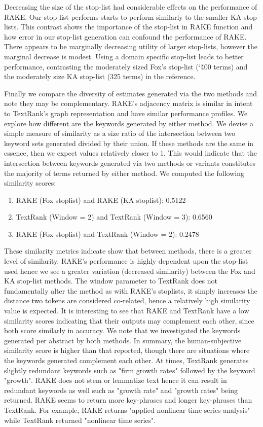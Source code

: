 \documentclass[11pt,a4paper]{article}
\begin{document}
Decreasing the size of the stop-list had considerable effects on the performance of RAKE. Our stop-list performs starts to perform similarly to the smaller KA stop-lists.  This contrast shows the importance of the stop-list in RAKE function and how error in our stop-list generation can confound the performance of RAKE. There appears to be marginally decreasing utility of larger stop-lists, however the marginal decrease is modest. Using a domain specific stop-list leads to better performance, contrasting the moderately sized Fox's stop-list (\char`\~400 terms) and the moderately size KA stop-list (325 terms) in the reference. 

Finally we compare the diversity of estimates generated via the two methods and note they may be complementary. RAKE's adjacency matrix is similar in intent to TextRank's graph representation and have similar performance profiles. We explore how different are the keywords generated by either method. We devise a simple measure of similarity as a size ratio of the intersection between two keyword sets generated divided by their union. If these methods are the same in essence, then we expect values relatively closer to 1. This would indicate that the intersection between keywords generated via two methods or variants constitutes the majority of terms returned by either method. We computed the following similarity scores:
\begin{enumerate}
	\small \itemsep0em 

	\item RAKE (Fox stoplist) and RAKE (KA stoplist): 0.5122
	\item TextRank (Window = 2) and TextRank (Window = 3):  0.6560
	\item RAKE (Fox stoplist) and TextRank (Window = 2): 0.2478
\normalsize
\end{enumerate}  

These similarity metrics indicate show that between methods, there is a greater level of similarity. RAKE's performance is highly dependent upon the stop-list used hence we see a greater variation (decreased similarity) between the Fox and KA stop-list methods. The window parameter to TextRank does not fundamentally alter the method as with RAKE's stoplists, it simply increases the distance two tokens are considered co-related, hence a relatively high similarity value is expected. It is interesting to see that  RAKE and TextRank have a low similarity scores indicating that their outputs may complement each other, since both score similarly in accuracy. We note that we investigated the keywords generated per abstract by both methods. In summary, the human-subjective similarity score is higher than that reported, though there are situations where the keywords generated complement each other. At times, TextRank generates slightly redundant keywords such as "firm growth rates" followed by the keyword "growth".  RAKE does not stem or lemmatize text hence it can result in redundant keywords as well such as "growth rate" and "growth rates" being returned. RAKE seems to return more key-phrases and longer key-phrases than TextRank. For example, RAKE returns "applied nonlinear time series analysis" while TextRank returned "nonlinear time series".
\end{document}
